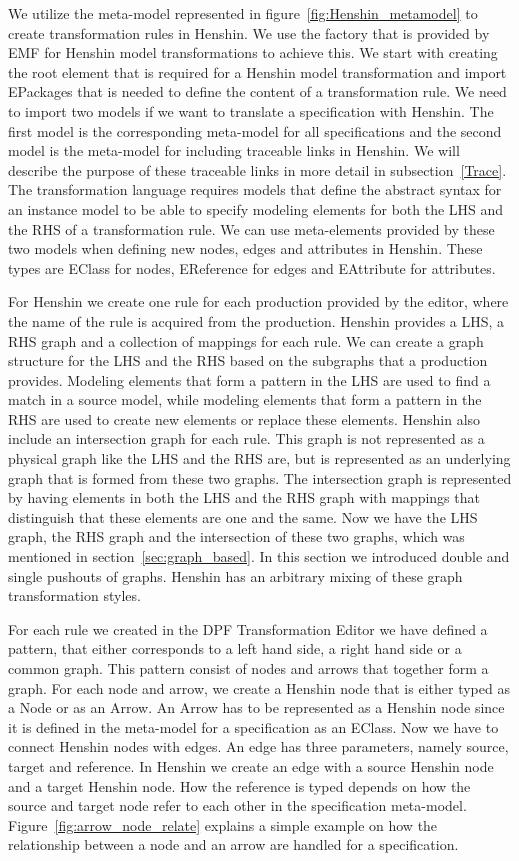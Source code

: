 We utilize the meta-model represented in figure~\ref{fig:Henshin_metamodel} to
create transformation rules in Henshin.  We use the factory that is provided by
EMF for Henshin model transformations to achieve this.
We start with creating the root element that is required for a Henshin model
transformation and import EPackages that is needed to define the content of a
transformation rule. We need to import two models if we want to translate a
specification with Henshin. The first model is the corresponding meta-model for
all specifications and the second model is the meta-model for including
traceable links in Henshin. We will describe the purpose of these traceable
links in more detail in subsection~\ref{Trace}. The transformation language
requires models that define the abstract syntax for an instance model to be
able to specify modeling elements for both the LHS and the RHS of a
transformation rule. We can use meta-elements provided by these two models when
defining new nodes, edges and attributes in Henshin. These types are EClass for
nodes, EReference for edges and EAttribute for attributes. 

For Henshin we create one rule for each production provided by the editor, where
the name of the rule is acquired from the production. Henshin
provides a LHS, a RHS graph and a collection of mappings for each rule. We can
create a graph structure for the LHS and the RHS based on the subgraphs that a
production provides. Modeling elements that form a pattern in the LHS are used
to find a match in a source model, while modeling elements that form a pattern
in the RHS are used to create new elements or replace these elements. Henshin
also include an intersection graph for each rule. This graph is not represented
as a physical graph like the LHS and the RHS are, but is represented as an
underlying graph that is formed from these two graphs. The intersection graph is
represented by having elements in both the LHS and the RHS graph with mappings
that distinguish that these elements are one and the same. Now we have the LHS
graph, the RHS graph and the intersection of these two graphs, which was
mentioned in section~\ref{sec:graph_based}. In this section we introduced double
and single pushouts of graphs. Henshin has an arbitrary mixing of these graph
transformation styles.

For each rule we created in the DPF Transformation Editor we have defined a
pattern, that either corresponds to a left hand side, a right hand side or a
common graph. This pattern consist of nodes and arrows that together form a
graph. For each node and arrow, we create a Henshin node that is either typed
as a Node or as an Arrow. An Arrow has to be represented as a Henshin node since
it is defined in the meta-model for a specification as an EClass. Now we have to
connect Henshin nodes with edges. An edge has three parameters, namely source,
target and reference. In Henshin we create an edge with a source Henshin node
and a target Henshin node. How the reference is typed depends on how the
source and target node refer to each other in the specification meta-model.
Figure~\ref{fig:arrow_node_relate} explains a simple example on how
the relationship between a node and an arrow are handled for a specification.

